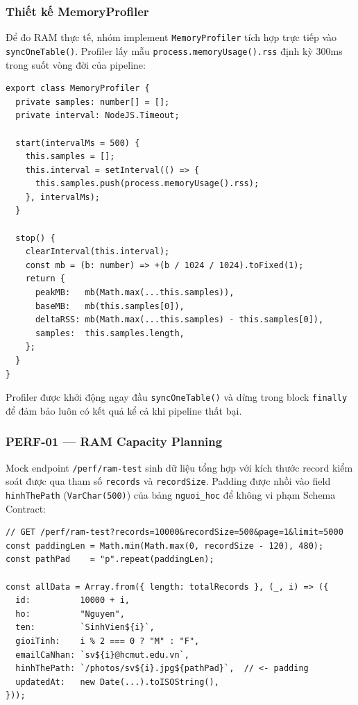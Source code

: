 \subsubsection{Thiết kế MemoryProfiler}

Để đo RAM thực tế, nhóm implement \texttt{MemoryProfiler} tích hợp
trực tiếp vào \texttt{syncOneTable()}. Profiler lấy mẫu
\texttt{process.memoryUsage().rss} định kỳ 300ms trong suốt vòng
đời của pipeline:

\begin{lstlisting}[caption={\texttt{MemoryProfiler} đo peak RSS trong sync pipeline},
  label={lst:memory-profiler}]
export class MemoryProfiler {
  private samples: number[] = [];
  private interval: NodeJS.Timeout;

  start(intervalMs = 500) {
    this.samples = [];
    this.interval = setInterval(() => {
      this.samples.push(process.memoryUsage().rss);
    }, intervalMs);
  }

  stop() {
    clearInterval(this.interval);
    const mb = (b: number) => +(b / 1024 / 1024).toFixed(1);
    return {
      peakMB:   mb(Math.max(...this.samples)),
      baseMB:   mb(this.samples[0]),
      deltaRSS: mb(Math.max(...this.samples) - this.samples[0]),
      samples:  this.samples.length,
    };
  }
}
\end{lstlisting}

Profiler được khởi động ngay đầu \texttt{syncOneTable()} và dừng
trong block \texttt{finally} để đảm bảo luôn có kết quả kể cả khi
pipeline thất bại.

\subsubsection{PERF-01 — RAM Capacity Planning}

Mock endpoint \texttt{/perf/ram-test} sinh dữ liệu tổng hợp với
kích thước record kiểm soát được qua tham số \texttt{records} và
\texttt{recordSize}. Padding được nhồi vào field \texttt{hinhThePath}
(\texttt{VarChar(500)}) của bảng \texttt{nguoi\_hoc} để không vi
phạm Schema Contract:

\begin{lstlisting}[caption={PERF-01: Sinh dữ liệu tổng hợp với kích thước kiểm soát},
  label={lst:perf01-mock}]
// GET /perf/ram-test?records=10000&recordSize=500&page=1&limit=5000
const paddingLen = Math.min(Math.max(0, recordSize - 120), 480);
const pathPad    = "p".repeat(paddingLen);

const allData = Array.from({ length: totalRecords }, (_, i) => ({
  id:          10000 + i,
  ho:          "Nguyen",
  ten:         `SinhVien${i}`,
  gioiTinh:    i % 2 === 0 ? "M" : "F",
  emailCaNhan: `sv${i}@hcmut.edu.vn`,
  hinhThePath: `/photos/sv${i}.jpg${pathPad}`,  // <- padding
  updatedAt:   new Date(...).toISOString(),
}));
\end{lstlisting}

